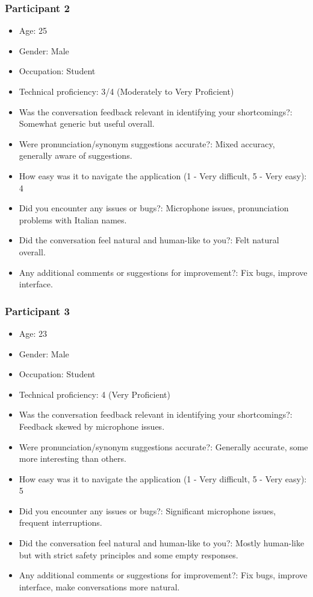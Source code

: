 \documentclass{article}
\begin{document}
\subsubsection{Participant 2}
\begin{itemize}
    \item Age: 25
    \item Gender: Male
    \item Occupation: Student
    \item Technical proficiency: 3/4 (Moderately to Very Proficient)
    \item Was the conversation feedback relevant in identifying your shortcomings?: Somewhat generic but useful overall.
    \item Were pronunciation/synonym suggestions accurate?: Mixed accuracy, generally aware of suggestions.
    \item How easy was it to navigate the application (1 - Very difficult, 5 - Very easy): 4
    \item Did you encounter any issues or bugs?: Microphone issues, pronunciation problems with Italian names.
    \item Did the conversation feel natural and human-like to you?: Felt natural overall.
    \item Any additional comments or suggestions for improvement?: Fix bugs, improve interface.
\end{itemize}

\subsubsection{Participant 3}
\begin{itemize}
    \item Age: 23
    \item Gender: Male
    \item Occupation: Student
    \item Technical proficiency: 4 (Very Proficient)
    \item Was the conversation feedback relevant in identifying your shortcomings?: Feedback skewed by microphone issues.
    \item Were pronunciation/synonym suggestions accurate?: Generally accurate, some more interesting than others.
    \item How easy was it to navigate the application (1 - Very difficult, 5 - Very easy): 5
    \item Did you encounter any issues or bugs?: Significant microphone issues, frequent interruptions.
    \item Did the conversation feel natural and human-like to you?: Mostly human-like but with strict safety principles and some empty responses.
    \item Any additional comments or suggestions for improvement?: Fix bugs, improve interface, make conversations more natural.
\end{itemize}
\end{document}
